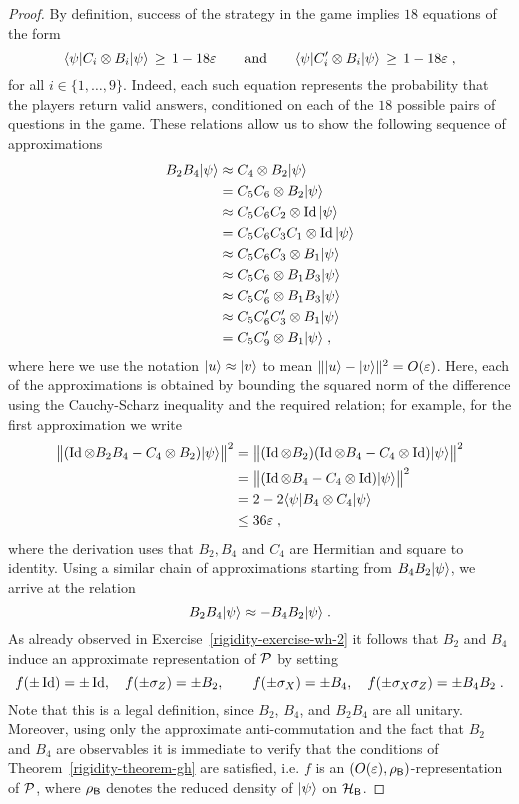 \begin{proof}
By definition, success of the strategy in the game implies $18$ equations of the form 
\begin{equation}
\label{equation-ms-bc-1}
 \langle\psi| C_i \otimes B_i |\psi\rangle \,\geq \, 1-18\varepsilon\qquad\text{and}\qquad \langle\psi| C'_i \otimes B_i |\psi\rangle \,\geq \, 1-18\varepsilon\;,
\end{equation}
for all $i\in \{1,\ldots,9\}$. Indeed, each such equation represents the probability that the players return valid answers, conditioned on each of the $18$ possible pairs of questions in the game. These relations allow us to show the following sequence of approximations
\begin{align*}
B_2 B_4 |\psi\rangle & \approx C_4 \otimes B_2 |\psi\rangle\\
&= C_5 C_6 \otimes B_2 |\psi\rangle\\
&\approx C_5 C_6 C_2 \otimes \mathop{\rm Id}\nolimits |\psi\rangle\\
&= C_5 C_6 C_3 C_1 \otimes \mathop{\rm Id}\nolimits |\psi\rangle\\
&\approx C_5C_6C_3 \otimes B_1 |\psi\rangle\\
&\approx C_5C_6\otimes B_1 B_3 |\psi\rangle\\
&\approx C_5C'_6\otimes B_1 B_3 |\psi\rangle\\
&\approx C_5C'_6 C'_3\otimes B_1  |\psi\rangle\\
&=  C_5C'_9\otimes B_1  |\psi\rangle\;,
\end{align*}
where here we use the notation $|u\rangle\approx |v\rangle$ to mean $\||u\rangle - |v\rangle\|^2 = O(\varepsilon)$. Here, each of the approximations is obtained by bounding the squared norm of the difference using the Cauchy-Scharz inequality and the required relation; for example, for the first approximation we write
\begin{align*}
 \big\|(\mathop{\rm Id}\nolimits \otimes B_2 B_4 - C_4 \otimes B_2)|\psi\rangle\big\|^2
&= \big\|(\mathop{\rm Id}\nolimits \otimes B_2)(\mathop{\rm Id}\nolimits\otimes B_4 - C_4 \otimes \mathop{\rm Id}\nolimits)|\psi\rangle\big\|^2\\
&= \big\|(\mathop{\rm Id}\nolimits\otimes B_4 - C_4 \otimes \mathop{\rm Id}\nolimits)|\psi\rangle\big\|^2\\ 
&= 2 - 2 \langle\psi| B_4 \otimes C_4 |\psi\rangle \\
& \leq 36\varepsilon\;,
\end{align*}
where the derivation uses that $B_2,B_4$ and $C_4$ are Hermitian and square to identity. 
Using a similar chain of approximations starting from $B_4 B_2 |\psi\rangle$, we arrive at the relation
\[B_2B_4 |\psi\rangle \approx -B_4B_2 |\psi\rangle\;.\]
As already observed in Exercise~\ref{rigidity-exercise-wh-2} it follows that $B_2$ and $B_4$ induce an approximate representation of $\mathcal{P}$ by setting 
$$ f(\pm \mathop{\rm Id}\nolimits)=\pm\mathop{\rm Id}\nolimits,\quad f(\pm\sigma_Z)=\pm B_2,\quad\quad f(\pm\sigma_X)=\pm B_4,\quad f(\pm\sigma_X\sigma_Z) = \pm B_4B_2\;.$$
Note that this is a legal definition, since $B_2$, $B_4$, and $B_2B_4$ are all unitary. Moreover, using only the approximate anti-commutation and the fact that $B_2$ and $B_4$ are observables it is immediate to verify that the conditions of Theorem~\ref{rigidity-theorem-gh} are satisfied, i.e. $f$ is an $(O({\varepsilon}),\rho_{\textsf{B}})$-representation of $\mathcal{P}$, where $\rho_{\textsf{B}}$ denotes the reduced density of $|\psi\rangle$ on $\mathcal{H}_{\textsf{B}}$.  


\end{proof}
